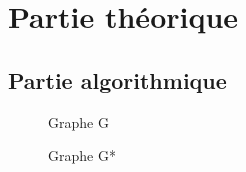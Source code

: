 \documentclass{article}
\begin{document}
\section{Partie théorique}
\subsection{Partie algorithmique}

\begin{figure}[h!]
  \centering
  \begin{tikzpicture}
  \end{tikzpicture}
  \caption{Graphe G}
\label{fig:graphe-g}
\end{figure}

\begin{figure}[h!]
  \centering
  \begin{tikzpicture}
  \end{tikzpicture}
  \caption{Graphe G*}
\label{fig:graphe-g*}
\end{figure}
\end{document}
